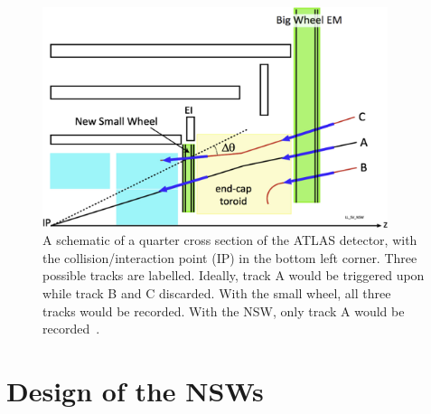 
\begin{figure}
    \centering
    \includegraphics[width = 0.9\textwidth]{figures/perez-codina_NSW_tracks.jpg}
    \caption{A schematic of a quarter cross section of the ATLAS detector, with the collision/interaction point (IP) in the bottom left corner. Three possible tracks are labelled. Ideally, track A would be triggered upon while track B and C discarded. With the small wheel, all three tracks would be recorded. With the NSW, only track A would be recorded~\cite{nsw_tdr}.}
    \label{fig:nsw_track_triggering}
\end{figure}

\section{Design of the NSWs}

